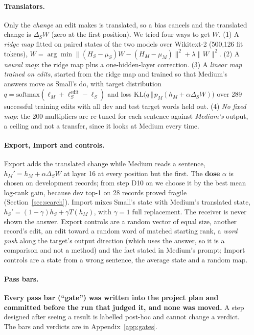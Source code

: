 \documentclass[11pt,twocolumn]{article}
\begin{document}
\paragraph{Translators.} Only the \emph{change} an edit makes is translated, so a bias cancels and the translated change is $\Delta_S W$ (zero at the first position). We tried four ways to get $W$. (1) A \emph{ridge map} \citep{hoerl1970} fitted on paired states of the two models over Wikitext-2 \citep{merity2017} (500,126 fit tokens), $W=\arg\min\lVert(H_S-\mu_S)W-(H_M-\mu_M)\rVert^2+\lambda\lVert W\rVert^2$. (2) A \emph{neural map}: the ridge map plus a one-hidden-layer correction. (3) A \emph{linear map trained on edits}, started from the ridge map and trained so that Medium's answers move as Small's do, with target distribution $q=\mathrm{softmax}(\ell_M+\ell_S^{\mathrm{edit}}-\ell_S)$ and loss $\mathrm{KL}\bigl(q\,\Vert\,p_M(h_M+\alpha\Delta_SW)\bigr)$ over 289 successful training edits with all dev and test target words held out. (4) \emph{No fixed map}: the 200 multipliers are re-tuned for each sentence against \emph{Medium's} output, a ceiling and not a transfer, since it looks at Medium every time.

\paragraph{Export, Import and controls.} Export adds the translated change while Medium reads a sentence, $h_M'=h_M+\alpha\Delta_SW$ at layer 16 at every position but the first. The \textbf{dose} $\alpha$ is chosen on development records; from step D10 on we choose it by the best mean log-rank gain, because dev top-1 on 28 records proved fragile (Section~\ref{sec:search}). Import mixes Small's state with Medium's translated state, $h_S'=(1-\gamma)h_S+\gamma T(h_M)$, with $\gamma=1$ full replacement. The receiver is never shown the answer. Export controls are a random vector of equal size, another record's edit, an edit toward a random word of matched starting rank, a \emph{word push} along the target's output direction (which uses the answer, so it is a comparison and not a method) and the fact stated in Medium's prompt; Import controls are a state from a wrong sentence, the average state and a random map.

\paragraph{Pass bars.} \textbf{Every pass bar (``gate'') was written into the project plan and committed before the run that judged it, and none was moved.} A step designed after seeing a result is labelled post-hoc and cannot change a verdict. The bars and verdicts are in Appendix~\ref{app:gates}.
\end{document}
